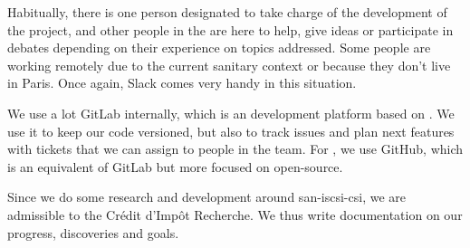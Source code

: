 Habitually, there is one person designated to take charge of the development of the project, and other people in the  are here to help, give ideas or participate in debates depending on their experience on topics addressed. Some people are working remotely due to the current sanitary context or because they don't live in Paris. Once again, Slack comes very handy in this situation.

We use a lot GitLab internally, which is an  development platform based on . We use it to keep our code versioned, but also to track issues and plan next features with tickets that we can assign to people in the team. For , we use GitHub, which is an equivalent of GitLab but more focused on open-source.

Since we do some research and development around \gls{san-iscsi-csi}, we are admissible to the Crédit d'Impôt Recherche. We thus write documentation on our progress, discoveries and goals.

\clearpage
